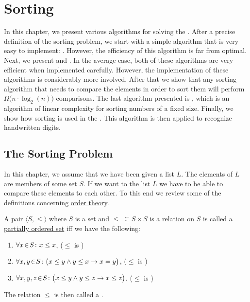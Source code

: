\chapter{Sorting}
In this chapter, we present various algorithms for solving the .
After a precise definition of the sorting problem, we start with a simple algorithm
that is very easy to implement: .  However, the
efficiency of this algorithm is far from optimal.  Next, we present 
 and .  In the average case, both of these algorithms are very efficient when implemented carefully.
However, the implementation of these algorithms is considerably more involved.
After that we show that any sorting algorithm that needs to compare the elements in order to sort them will
perform $\Omega\bigl(n \cdot \log_2(n)\bigr)$ comparisons.  The last algorithm presented is , which is an
algorithm of linear complexity for sorting numbers of a fixed size.
Finally, we show how sorting is used in the .
This algorithm is then applied to recognize handwritten digits.

\section{The Sorting Problem}
In this chapter, we assume that we have been given a list $L$.  The elements of $L$ are members of
some set $S$.  If we want to  the list $L$ we have to be able to compare these elements
to each other.  To this end we review some of the definitions concerning \href{https://en.wikipedia.org/wiki/Order_theory}{order theory}.  

\begin{Definition} 
  A pair $\langle S, \leq \rangle$ where $S$ is a set and $\leq \;\subseteq S \times S$ is a relation  on $S$ is called a
  \href{http://en.wikipedia.org/wiki/Partially_ordered_set}{partially ordered set}  
  iff we have the following:
  \begin{enumerate}
  \item $\forall x \!\in\! S \colon x \leq x$,                      \hspace*{\fill} ($\leq$ is )
  \item $\forall x, y \!\in\! S \colon \bigl(x \leq y \wedge y \leq x
  \rightarrow x = y\bigr)$,   \hspace*{\fill} ($\leq$ is )
  \item $\forall x, y, z \!\in\! S \colon \bigl(x \leq y \wedge y \leq z \rightarrow x \leq z\bigr)$.  \hspace*{\fill} ($\leq$ is )
  \end{enumerate}
  The relation $\leq$ is then called a . \eox
\end{Definition}

